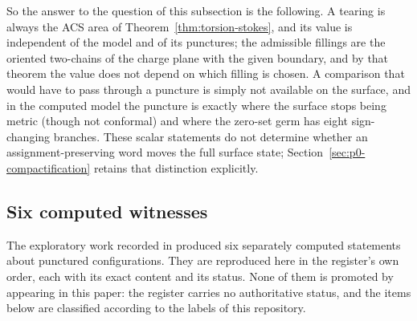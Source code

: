 So the answer to the question of this subsection is the following.  A tearing is
always the ACS area of Theorem~\ref{thm:torsion-stokes}, and its value is
independent of the model and of its punctures; the admissible fillings are the
oriented two-chains of the charge plane with the given boundary, and by that
theorem the value does not depend on which filling is chosen.  A comparison that
would have to pass through a puncture is simply not available on the surface, and
in the computed model the puncture is exactly where the surface stops being
metric (though not conformal) and where the zero-set germ has eight
sign-changing branches.  These scalar statements do not determine whether an assignment-preserving
word moves the full surface state; Section~\ref{sec:p0-compactification}
retains that distinction explicitly.

\subsection{Six computed witnesses}
\label{subsec:p0-holed-witnesses}

The exploratory work recorded in \cite{Yuan2026AEGHoleRegister} produced six
separately computed statements about punctured configurations.  They are
reproduced here in the register's own order, each with its exact content and its
status.  None of them is promoted by appearing in this paper: the register
carries no authoritative status, and the items below are classified according to
the labels of this repository.

